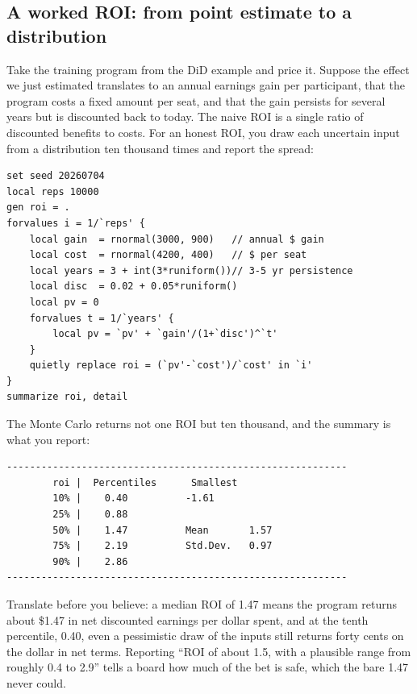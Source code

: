 \subsection{A worked ROI: from point estimate to a distribution}
Take the training program from the DiD example and price it. Suppose the effect we just estimated translates to an annual earnings gain per participant, that the program costs a fixed amount per seat, and that the gain persists for several years but is discounted back to today. The naive ROI is a single ratio of discounted benefits to costs. For an honest ROI, you draw each uncertain input from a distribution ten thousand times and report the spread:
\par
{\footnotesize
\begin{verbatim}
set seed 20260704
local reps 10000
gen roi = .
forvalues i = 1/`reps' {
    local gain  = rnormal(3000, 900)   // annual $ gain
    local cost  = rnormal(4200, 400)   // $ per seat
    local years = 3 + int(3*runiform())// 3-5 yr persistence
    local disc  = 0.02 + 0.05*runiform()
    local pv = 0
    forvalues t = 1/`years' {
        local pv = `pv' + `gain'/(1+`disc')^`t'
    }
    quietly replace roi = (`pv'-`cost')/`cost' in `i'
}
summarize roi, detail
\end{verbatim}
}
The Monte Carlo returns not one ROI but ten thousand, and the summary is what you report:
\par
{\footnotesize
\begin{verbatim}
-----------------------------------------------------------
        roi |  Percentiles      Smallest
        10% |    0.40          -1.61
        25% |    0.88
        50% |    1.47          Mean       1.57
        75% |    2.19          Std.Dev.   0.97
        90% |    2.86
-----------------------------------------------------------
\end{verbatim}
}
Translate before you believe: a median ROI of 1.47 means the program returns about \$1.47 in net discounted earnings per dollar spent, and at the tenth percentile, 0.40, even a pessimistic draw of the inputs still returns forty cents on the dollar in net terms. Reporting \enquote{ROI of about 1.5, with a plausible range from roughly 0.4 to 2.9} tells a board how much of the bet is safe, which the bare 1.47 never could.


